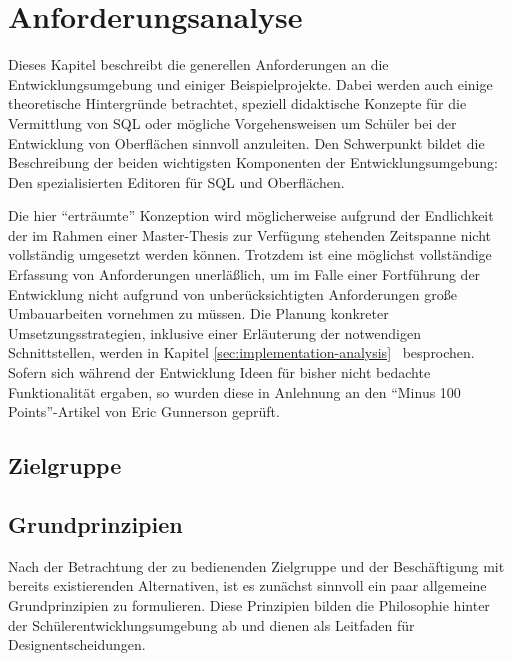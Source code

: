 \section{Anforderungsanalyse}

Dieses Kapitel beschreibt die generellen Anforderungen an die Entwicklungsumgebung und einiger Beispielprojekte. Dabei werden auch einige theoretische Hintergründe betrachtet, speziell didaktische Konzepte für die Vermittlung von SQL oder mögliche Vorgehensweisen um Schüler bei der Entwicklung von Oberflächen sinnvoll anzuleiten. Den Schwerpunkt bildet die Beschreibung der beiden wichtigsten Komponenten der Entwicklungsumgebung: Den spezialisierten Editoren für SQL und Oberflächen.

Die hier ``erträumte'' Konzeption wird möglicherweise aufgrund der Endlichkeit der im Rahmen einer Master-Thesis zur Verfügung stehenden Zeitspanne nicht vollständig umgesetzt werden können. Trotzdem ist eine möglichst vollständige Erfassung von Anforderungen unerläßlich, um im Falle einer Fortführung der Entwicklung nicht aufgrund von unberücksichtigten Anforderungen große Umbauarbeiten vornehmen zu müssen. Die Planung konkreter Umsetzungsstrategien, inklusive einer Erläuterung der notwendigen Schnittstellen, werden in Kapitel \ref{sec:implementation-analysis}~ besprochen. Sofern sich während der Entwicklung Ideen für bisher nicht bedachte Funktionalität ergaben, so wurden diese in Anlehnung an den ``Minus 100 Points''-Artikel von Eric Gunnerson \cite{gunnerson-minus-100} geprüft.


\subsection{Zielgruppe}
\label{sec:target-audience}


\subsection{Grundprinzipien}
\label{sec:principles}

Nach der Betrachtung der zu bedienenden Zielgruppe und der Beschäftigung mit bereits existierenden Alternativen, ist es zunächst sinnvoll ein paar allgemeine Grundprinzipien zu formulieren. Diese Prinzipien bilden die Philosophie hinter der Schülerentwicklungsumgebung ab und dienen als Leitfaden für Designentscheidungen.

